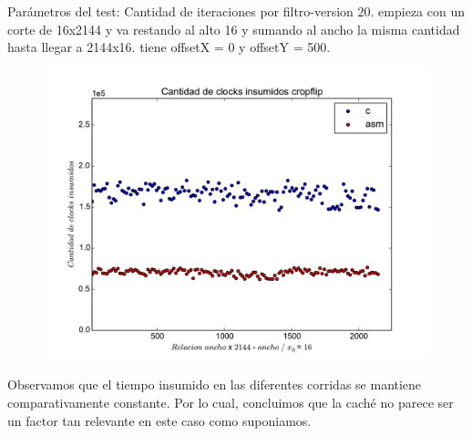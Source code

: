 Parámetros del test: 
Cantidad de iteraciones por filtro-version 20.
empieza con un corte de 16x2144 y va restando al alto 16 y sumando al ancho la misma cantidad hasta llegar a 2144x16. tiene offsetX = 0 y offsetY = 500.

\begin{figure}[h]
  \begin{center}
	\includegraphics[scale=0.5]{cachecropflip.pdf}
  \end{center}
\end{figure}


Observamos que el tiempo insumido en las diferentes corridas se mantiene comparativamente constante. Por lo cual, concluimos que la caché no parece ser un factor tan relevante en este caso como suponiamos. 
\newpage
